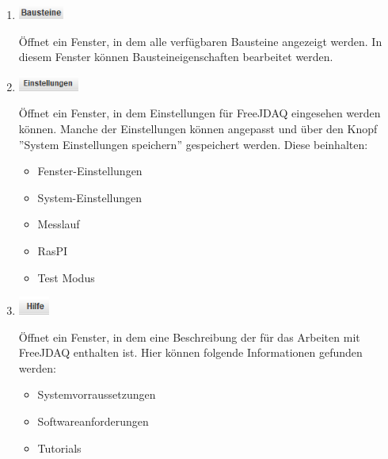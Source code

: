 \documentclass[parskip=full]{scrartcl}
\begin{document}
\begin{enumerate}
    \clearpage
    \item
    \begin{flushleft}
        \includegraphics[width = 1.5cm]{Grafiken/1-Bausteine.png}
    \end{flushleft}

    Öffnet ein Fenster, in dem alle verfügbaren Bausteine angezeigt werden. In diesem Fenster können Bausteineigenschaften bearbeitet werden.
    
    \item
    \begin{flushleft}
        \includegraphics[width = 2cm]{Grafiken/2-Einstellungen.png}
    \end{flushleft}
    Öffnet ein Fenster, in dem Einstellungen für FreeJDAQ eingesehen werden können. Manche der Einstellungen können angepasst und über den Knopf ''System Einstellungen speichern'' gespeichert werden. Diese beinhalten:
    \begin{itemize}
        \item Fenster-Einstellungen
        \item System-Einstellungen
        \item Messlauf
        \item RasPI
        \item Test Modus
    \end{itemize}
    
    \item
    \begin{flushleft}
        \includegraphics[width = 1cm]{Grafiken/3-Hilfe.png}
    \end{flushleft}
    
    Öffnet ein Fenster, in dem eine Beschreibung der für das Arbeiten mit FreeJDAQ enthalten ist. Hier können folgende Informationen gefunden werden:
    \begin{itemize}
        \item Systemvorraussetzungen
        \item Softwareanforderungen
        \item Tutorials
    \end{itemize}


\end{enumerate}
\end{document}

